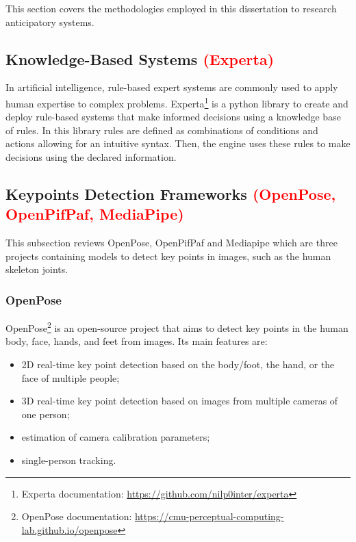 This section covers the methodologies employed in this dissertation to research anticipatory systems.

\subsection{Knowledge-Based Systems \textcolor{red}{(Experta)}}

In artificial intelligence, rule-based expert systems are commonly used to apply human expertise to complex problems. Experta\footnote{Experta documentation: \url{https://github.com/nilp0inter/experta}} is a python library to create and deploy rule-based systems that make informed decisions using a knowledge base of rules. In this library rules are defined as combinations of conditions and actions allowing for an intuitive syntax. Then, the engine uses these rules to make decisions using the declared information.

\subsection{Keypoints Detection Frameworks \textcolor{red}{(OpenPose, OpenPifPaf, MediaPipe)}}
\label{subsection:keypointdetection}

This subsection reviews OpenPose, OpenPifPaf and Mediapipe which are three projects containing models to detect key points in images, such as the human skeleton joints.

\subsubsection{OpenPose}

OpenPose\cite{Cao2021,Simon2017,Cao2018,Wei2016}\footnote{OpenPose documentation: \url{https://cmu-perceptual-computing-lab.github.io/openpose}} is an open-source project that aims to detect key points in the human body, face, hands, and feet from images. Its main features are:

\begin{itemize}
    \item 2D real-time key point detection based on the body/foot, the hand, or the face of multiple people;
    \item 3D real-time key point detection based on images from multiple cameras of one person;
    \item estimation of camera calibration parameters;
    \item single-person tracking.
\end{itemize}

